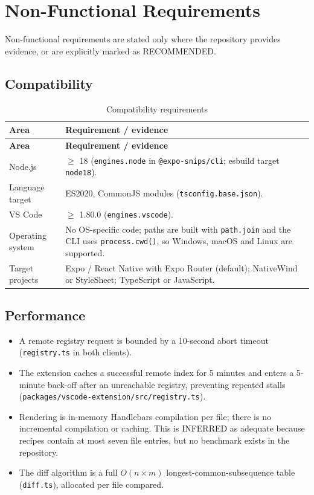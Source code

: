 \chapter{Non-Functional Requirements}
\label{ch:non-functional-requirements}

Non-functional requirements are stated only where the repository provides
evidence, or are explicitly marked as RECOMMENDED.

\section{Compatibility}

\begin{longtable}{@{}L{4.2cm}L{10cm}@{}}
\caption{Compatibility requirements}\\
\toprule
\textbf{Area} & \textbf{Requirement / evidence} \\
\midrule
\endfirsthead
\toprule
\textbf{Area} & \textbf{Requirement / evidence} \\
\midrule
\endhead
Node.js & $\geq$ 18 (\texttt{engines.node} in \texttt{@expo-snips/cli}; esbuild
target \texttt{node18}). \\
Language target & ES2020, CommonJS modules (\texttt{tsconfig.base.json}). \\
VS Code & $\geq$ 1.80.0 (\texttt{engines.vscode}). \\
Operating system & No OS-specific code; paths are built with \texttt{path.join}
and the CLI uses \texttt{process.cwd()}, so Windows, macOS and Linux are supported. \\
Target projects & Expo / React Native with Expo Router (default); NativeWind or
StyleSheet; TypeScript or JavaScript. \\
\bottomrule
\end{longtable}

\section{Performance}

\begin{itemize}
  \item A remote registry request is bounded by a 10-second abort timeout
        (\texttt{registry.ts} in both clients).
  \item The extension caches a successful remote index for 5 minutes and enters a
        5-minute back-off after an unreachable registry, preventing repeated stalls
        (\texttt{packages/vscode-extension/src/registry.ts}).
  \item Rendering is in-memory Handlebars compilation per file; there is no
        incremental compilation or caching. This is INFERRED as adequate because
        recipes contain at most seven file entries, but no benchmark exists in the
        repository.
  \item The diff algorithm is a full $O(n \times m)$ longest-common-subsequence
        table (\texttt{diff.ts}), allocated per file compared.
\end{itemize}

